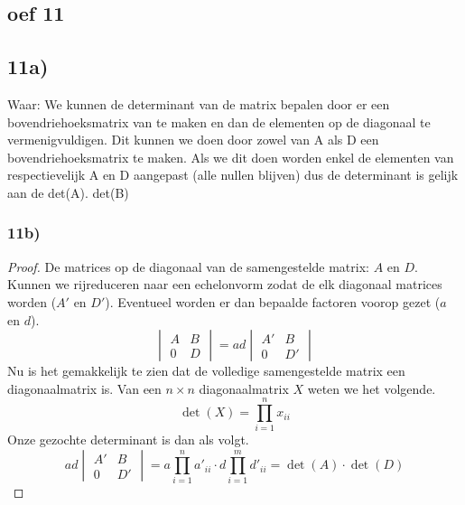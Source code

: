 \documentclass[10pt,a4paper]{article}
\begin{document}
\subsection*{oef 11}
\subsection*{11a)}
Waar: We kunnen de determinant van de matrix bepalen door er een bovendriehoeksmatrix van te maken en dan de elementen op de diagonaal te vermenigvuldigen. Dit kunnen we doen door zowel van A als D een bovendriehoeksmatrix te maken. Als we dit doen worden enkel de elementen van respectievelijk A en D aangepast (alle nullen blijven) dus de determinant is gelijk aan de det(A). det(B)

\subsubsection*{11b)}
\begin{proof}
De matrices op de diagonaal van de samengestelde matrix: $A$ en $D$. Kunnen we rijreduceren naar een echelonvorm zodat de elk diagonaal matrices worden ($A'$ en $D'$). Eventueel worden er dan bepaalde factoren voorop gezet ($a$ en $d$).
\[
\begin{vmatrix}
A & B\\
0 & D
\end{vmatrix}
=
ad
\begin{vmatrix}
A' & B\\
0 & D'
\end{vmatrix}
\]
Nu is het gemakkelijk te zien dat de volledige samengestelde matrix een diagonaalmatrix is.
Van een $n\times n$ diagonaalmatrix $X$ weten we het volgende.
\[
\det \left({X}\right) = \prod_{i \mathop = 1}^n x_{ii}
\]
Onze gezochte determinant is dan als volgt.
\[
ad
\begin{vmatrix}
A' & B\\
0 & D'
\end{vmatrix} = a\prod_{i \mathop = 1}^n a'_{ii} \cdot d \prod_{i \mathop = 1}^m d'_{ii} = \det \left({A}\right)\cdot\det \left({D}\right)
\]
\end{proof}
\end{document}
